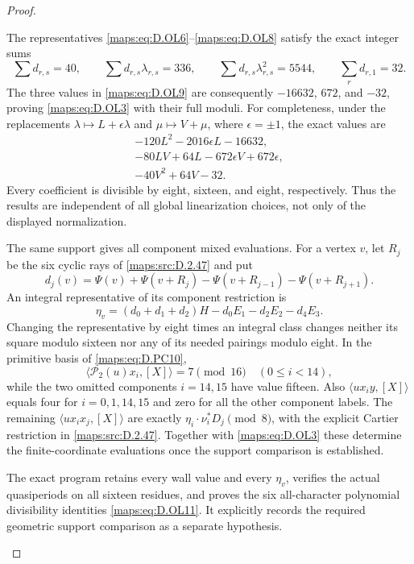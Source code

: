 \begin{proof}
\begin{enumerate}[label=\arabic*.,leftmargin=*]
The representatives \eqref{maps:eq:D.OL6}--\eqref{maps:eq:D.OL8} satisfy the exact integer sums
\[
 \sum d_{r,s}=40,\qquad \sum d_{r,s}\lambda_{r,s}=336,
 \qquad \sum d_{r,s}\lambda_{r,s}^2=5544,
 \qquad \sum_r d_{r,1}=32.                               \tag{D.OL10}\label{maps:eq:D.OL10}
\]
The three values in \eqref{maps:eq:D.OL9} are consequently $-16632$, $672$,
and $-32$, proving \eqref{maps:eq:D.OL3} with their full moduli.
For completeness, under the replacements
$\lambda\mapsto L+\epsilon\lambda$ and $\mu\mapsto V+\mu$,
where $\epsilon=\pm1$, the exact values are
\[
 \begin{aligned}
 -120L^2-2016\epsilon L-16632,\\
 -80LV+64L-672\epsilon V+672\epsilon,\\
 -40V^2+64V-32.
 \end{aligned}                                             \tag{D.OL11}\label{maps:eq:D.OL11}
\]
Every coefficient is divisible by eight, sixteen, and eight,
respectively. Thus the results are independent of all global
linearization choices, not only of the displayed normalization.

The same support gives all component mixed evaluations. For a
vertex $v$, let $R_j$ be the six cyclic rays of \ref{maps:src:D.2.47} and put
\[
 d_j(v)=\Psi(v)+\Psi(v+R_j)
                  -\Psi(v+R_{j-1})-\Psi(v+R_{j+1}).
\]
An integral representative of its component restriction is
\[
 \eta_v=(d_0+d_1+d_2)H-d_0E_1-d_2E_2-d_4E_3.
                                                               \tag{D.OL12}\label{maps:eq:D.OL12}
\]
Changing the representative by eight times an integral class
changes neither its square modulo sixteen nor any of its needed
pairings modulo eight. In the primitive basis of \eqref{maps:eq:D.PC10},
\[
 \langle\mathcal P_2(u)x_i,[X]\rangle=7\pmod{16}
                     \quad(0\le i<14),
\]
while the two omitted components $i=14,15$ have value fifteen.
Also $\langle ux_i y,[X]\rangle$ equals four for $i=0,1,14,15$
and zero for all the other component labels. The remaining
$\langle ux_i x_j,[X]\rangle$ are exactly
$\eta_i\cdot\nu_i^*D_j\pmod8$, with the explicit Cartier
restriction in \ref{maps:src:D.2.47}. Together with \eqref{maps:eq:D.OL3} these determine the
finite-coordinate evaluations once the support comparison is
established.

The exact program
retains every wall value and every $\eta_v$, verifies the actual
quasiperiods on all sixteen residues, and proves the six
all-character polynomial divisibility identities \eqref{maps:eq:D.OL11}.
It explicitly records the required geometric support comparison
as a separate hypothesis.


\end{enumerate}
\end{proof}
